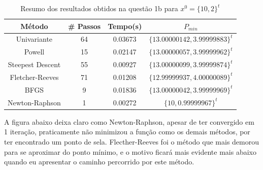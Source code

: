 \documentclass[10pt, a4paper]{article}
\begin{document}
\begin{table}[H]
  \begin{center}
    \begin{tabular}{c|c|c|c}
      \textbf{Método} & \textbf{\# Passos} & \textbf{Tempo(s)} & \textbf{$P_{min}$}\\
      \hline
      Univariante & 64 & 0.03673 & $\{13.00000142, 3.99999883\}^t$\\
      Powell & 15 & 0.02147 & $\{13.00000057, 3.99999962\}^t$\\
      Steepest Descent & 55 & 0.00927 & $\{13.00000099, 3.99999874\}^t$\\
      Fletcher-Reeves & 71 & 0.01208 & $\{12.99999937, 4.00000089\}^t$\\
      BFGS & 9 & 0.01836 & $\{13.00000042, 3.99999969\}^t$\\
      Newton-Raphson & 1 & 0.00272 & $\{10, 0.99999967\}^t$\\
    \end{tabular}
  \end{center}
  \caption{Resumo dos resultados obtidos na questão 1b para $x^0 = \{10,2\}^t$}
\end{table}


A figura abaixo deixa claro como Newton-Raphson, apesar de ter convergido em 1 iteração, praticamente não minimizou
a função como os demais métodos, por ter encontrado um ponto de sela. Flecther-Reeves foi o método que mais demorou
para se aproximar do ponto mínimo, e o motivo ficará mais evidente mais abaixo quando eu apresentar o caminho percorrido
por este método.


\end{document}
